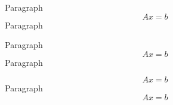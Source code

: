 Paragraph
\begin{equation}
Ax=b
\end{equation}
Paragraph

Paragraph
\begin{equation}
Ax=b
\end{equation}
Paragraph

\begin{equation}
Ax=b
\end{equation}
Paragraph
\begin{equation}
Ax=b
\end{equation}